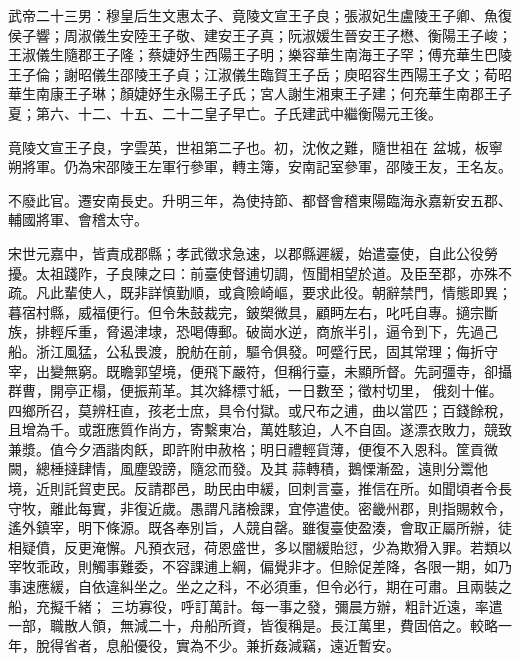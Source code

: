 
\begin{pinyinscope}

 武帝二十三男：穆皇后生文惠太子、竟陵文宣王子良；張淑妃生盧陵王子卿、魚復侯子響；周淑儀生安陸王子敬、建安王子真；阮淑媛生晉安王子懋、衡陽王子峻；王淑儀生隨郡王子隆；蔡婕妤生西陽王子明；樂容華生南海王子罕；傅充華生巴陵王子倫；謝昭儀生邵陵王子貞；江淑儀生臨賀王子岳；庾昭容生西陽王子文；荀昭華生南康王子琳；顏婕妤生永陽王子氏；宮人謝生湘東王子建；何充華生南郡王子夏；第六、十二、十五、二十二皇子早亡。子氏建武中繼衡陽元王後。



 竟陵文宣王子良，字雲英，世祖第二子也。初，沈攸之難，隨世祖在
 盆城，板寧朔將軍。仍為宋邵陵王左軍行參軍，轉主簿，安南記室參軍，邵陵王友，王名友。



 不廢此官。遷安南長史。升明三年，為使持節、都督會稽東陽臨海永嘉新安五郡、輔國將軍、會稽太守。



 宋世元嘉中，皆責成郡縣；孝武徵求急速，以郡縣遲緩，始遣臺使，自此公役勞擾。太祖踐阼，子良陳之曰：前臺使督逋切調，恆聞相望於道。及臣至郡，亦殊不疏。凡此輩使人，既非詳慎勤順，或貪險崎嶇，要求此役。朝辭禁門，情態即異；暮宿村縣，威福便行。但令朱鼓裁完，鈹槊微具，顧眄左右，叱吒自專。擿宗斷族，排輕斥重，脅遏津埭，恐喝傳郵。破崗水逆，商旅半引，逼令到下，先過己船。浙江風猛，公私畏渡，脫舫在前，驅令俱發。呵蹙行民，固其常理；侮折守宰，出變無窮。既瞻郭望境，便飛下嚴符，但稱行臺，未顯所督。先訶彊寺，卻攝群曹，開亭正榻，便振荊革。其次絳標寸紙，一日數至；徵村切里，
 俄刻十催。四鄉所召，莫辨枉直，孩老士庶，具令付獄。或尺布之逋，曲以當匹；百錢餘稅，且增為千。或誑應質作尚方，寄繫東冶，萬姓駭迫，人不自固。遂漂衣敗力，競致兼漿。值今夕酒諧肉飫，即許附申赦格；明日禮輕貨薄，便復不入恩科。筐貢微闕，總棰撻肆情，風塵毀謗，隨忿而發。及其蒜轉積，鵝慄漸盈，遠則分鬻他境，近則託貿吏民。反請郡邑，助民由申緩，回刺言臺，推信在所。如聞頃者令長守牧，離此每實，非復近歲。愚謂凡諸檢課，宜停遣使。密畿州郡，則指賜敕令，遙外鎮宰，明下條源。既各奉別旨，人競自罄。雖復臺使盈湊，會取正屬所辦，徒相疑僨，反更淹懈。凡預衣冠，荷恩盛世，多以闇緩貽愆，少為欺猾入罪。若類以宰牧乖政，則觸事難委，不容課逋上綱，偏覺非才。但賒促差降，各限一期，如乃事速應緩，自依違糾坐之。坐之之科，不必須重，但令必行，期在可肅。且兩裝之船，充擬千緒；
 三坊寡役，呼訂萬計。每一事之發，彌晨方辦，粗計近遠，率遣一部，職散人領，無減二十，舟船所資，皆復稱是。長江萬里，費固倍之。較略一年，脫得省者，息船優役，實為不少。兼折姦減竊，遠近暫安。




\end{pinyinscope}
